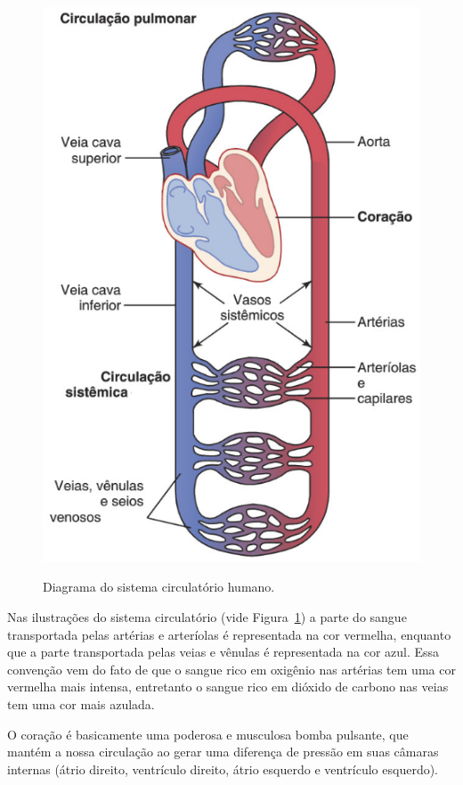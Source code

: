 \begin{figure}[!htb]
  \centering
  \captiondelim{: }
  \caption{Diagrama do sistema circulatório humano.}
  \includegraphics[scale=0.4]{figuras/revisao-sistema-circulatorio/sistema-circulatorio-humano.png}
  \label{fig:sistema-circulatorio}
\end{figure}

Nas ilustrações do sistema circulatório (vide Figura~\ref{fig:sistema-circulatorio}) a parte
do sangue transportada pelas artérias 
e arteríolas é representada na cor vermelha, enquanto que a parte transportada pelas veias e 
vênulas é representada na cor azul. Essa convenção vem do fato de que o sangue rico 
em oxigênio nas artérias tem uma cor vermelha mais intensa, entretanto o sangue rico em dióxido de 
carbono nas veias tem uma cor mais azulada.

O coração é basicamente uma poderosa e musculosa bomba pulsante, que mantém 
a nossa circulação ao gerar uma diferença de pressão em suas câmaras internas 
(átrio direito, ventrículo direito, átrio esquerdo e ventrículo esquerdo).

